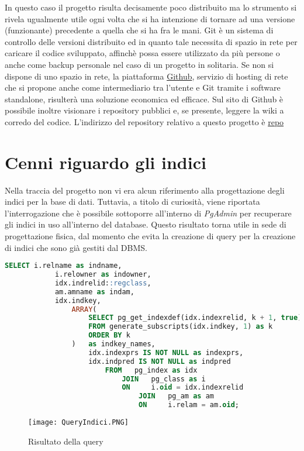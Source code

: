 \documentclass[12pt,a4paper,onecolumn,x11names]{article}
\begin{document}
		\begin{flushleft}
			In questo caso il progetto risulta decisamente poco distribuito ma lo strumento si rivela ugualmente utile ogni volta che si ha intenzione di tornare ad una versione (funzionante) precedente a quella che si ha fra le mani.\newline
			Git è un sistema di controllo delle versioni distribuito ed in quanto tale necessita di spazio in rete per caricare il codice sviluppato, affinchè possa essere utilizzato da più persone o anche come backup personale nel caso di un progetto in solitaria. Se non si dispone di uno spazio in rete, la piattaforma \textsf{\href{https://github.com/}{Github}}, servizio di hosting di rete che si propone anche come intermediario tra l'utente e Git tramite i software standalone, risulterà una soluzione economica ed efficace. Sul sito di Github è possibile inoltre visionare i repository pubblici e, se presente, leggere la wiki a corredo del codice.\newline\newline
			L'indirizzo del repository relativo a questo progetto è \textsf{\href{https://github.com/dailytowns/ProgettoBasi}{repo}}
		\end{flushleft}

%

\newpage

\section{Cenni riguardo gli indici}

	\begin{flushleft}
		Nella traccia del progetto non vi era alcun riferimento alla progettazione degli indici per la base di dati. Tuttavia, a titolo di curiosità, viene riportata l'interrogazione che è possibile sottoporre all'interno di \textit{PgAdmin} per recuperare gli indici in uso all'interno del database. Questo risultato torna utile in sede di progettazione fisica, dal momento che evita la creazione di query per la creazione di indici che sono già gestiti dal DBMS.
	\end{flushleft}
	\begin{lstlisting}[language=SQL, caption=Cerca indici]
		SELECT i.relname as indname,
			i.relowner as indowner,
			idx.indrelid::regclass,
			am.amname as indam,
			idx.indkey,
				ARRAY(
					SELECT pg_get_indexdef(idx.indexrelid, k + 1, true)
					FROM generate_subscripts(idx.indkey, 1) as k
					ORDER BY k
				) 	as indkey_names,
					idx.indexprs IS NOT NULL as indexprs,
					idx.indpred IS NOT NULL as indpred
						FROM   pg_index as idx
							JOIN   pg_class as i
							ON     i.oid = idx.indexrelid
								JOIN   pg_am as am
								ON     i.relam = am.oid;
	\end{lstlisting}
	\vspace{20mm}
	\begin{figure}[h]
		\centering
		\texttt{[image: QueryIndici.PNG]}
		\caption{Risultato della query}
	\end{figure}
\newpage
\end{document}
